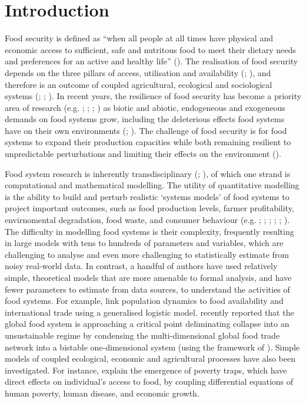 \documentclass[12pt]{article}
\begin{document}
\section{Introduction}
Food security is defined as ``when all people at all times have physical and economic access to sufficient, safe and nutritous food to meet their dietary needs and preferences for an active and healthy life'' (\cite{FAO1996}). The realisation of food security depends on the three pillars of access, utilisation and availability (\cite{maxwell1996}; \cite{barrett2010}), and therefore is an outcome of coupled agricultural, ecological and sociological systems (\cite{hammond2012}; \cite{ericksen2008}; \cite{ingram2011}). In recent years, the resilience of food security has become a priority area of research (e.g. \cite{nystrom2019}; \cite{tendall2015}; \cite{bene2016}; \cite{seekell2017}) as biotic and abiotic, endogeneous and exogeneous demands on food systems grow, including the deleterious effects food systems have on their own environments (\cite{springmann2018}; \cite{strzepek2010}). The challenge of food security is for food systems to expand their production capacities while both remaining resilient to unpredictable perturbations and limiting their effects on the environment (\cite{ericksen2010}).

Food system research is inherently transdisciplinary (\cite{drimie2013}; \cite{hammond2012}), of which one strand is computational and mathematical modelling. The utility of quantitative modelling is the ability to build and perturb realistic `systems models' of food systems to project important outcomes, such as food production levels, farmer profitability, envirnomental degradation, food waste, and consumer behaviour (e.g. \cite{springmann2018}; \cite{marchand2016}; \cite{sampedro2020}; \cite{suweis2015}; \cite{scalco2019}; \cite{allen2016}). The difficulty in modelling food systems is their complexity, frequently resulting in large models with tens to hundreds of parameters and variables, which are challenging to analyse and even more challenging to statistically estimate from noisy real-world data. In contrast, a handful of authors have used relatively simple, theoretical models that are more amenable to formal analysis, and have fewer parameters to estimate from data sources, to understand the activities of food systems. For example, \textcite{suweis2015} link population dynamics to food availability and international trade using a generalised logistic model. \textcite{tu2019} recently reported that the global food system is approaching a critical point deliminating collapse into an unsustainable regime by condensing the multi-dimensional global food trade network into a bistable one-dimensional system (using the framework of \cite{gao2016}). Simple models of coupled ecological, economic and agricultural processes have also been investigated. For instance, \textcite{ngonghala2017} explain the emergence of poverty traps, which have direct effects on individual's access to food, by coupling differential equations of human poverty, human disease, and economic growth.
\end{document}
